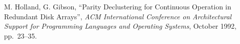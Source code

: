 \begin{thebibliography}{99}






M. Holland, G. Gibson,
``Parity Declustering for Continuous Operation in Redundant Disk Arrays'',
{\it ACM International Conference on Architectural Support for Programming Languages and Operating Systems},
October 1992, \mbox{pp. 23--35}.







\end{thebibliography}
